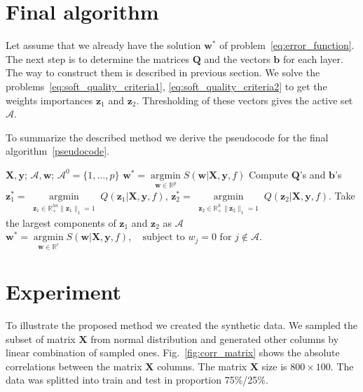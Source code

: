 \documentclass[a4paper,12pt]{article}
\theoremstyle{plain} %
\theoremstyle{definition} %
\theoremstyle{remark} %
\newcommand{\bb}{\mathbf{b}}
\newcommand{\bw}{\mathbf{w}}
\newcommand{\bQ}{\mathbf{Q}}
\newcommand{\by}{\mathbf{y}}
\newcommand{\bz}{\mathbf{z}}
\newcommand{\bX}{\mathbf{X}}
\newcommand{\cA}{\mathcal{A}}
\newcommand{\bbR}{\mathbb{R}}
\newcommand{\argmin}{\mathop{\arg \min}\limits}
\begin{document}
	\section{Final algorithm}
	Let assume that we already have the solution $\bw^*$ of problem~\ref{eq:error_function}.
	The next step is to determine the matrices $\bQ$ and the vectors $\bb$ for each layer. The way to construct them is described in previous section. 
	We solve the problems~\ref{eq:soft_quality_criteria1}, \ref{eq:soft_quality_criteria2} to get the weights importances $\bz_1$ and $\bz_2$. 
	Thresholding of these vectors gives the active set $\cA$.
	
	To summarize the described method we derive the pseudocode for the final algorithm~\ref{pseudocode}.
	
	
	\begin{algorithm}[h]
		\caption{}
		\label{pseudocode}
		\begin{algorithmic}[1]
			\REQUIRE $\bX, \by$;
			\ENSURE $\cA, \bw$;
			\STATE $\cA^0 = \{1, \dots, p\}$
			\STATE $\bw^* = \argmin_{\bw \in \bbR^p} S(\bw | \bX, \by, f)$
			\vspace{0.1cm}
			\STATE Compute $\bQ$'s and $\bb$'s			
			\vspace{0.1cm}
			\STATE 
			$\bz_1^* = \argmin_{\substack{\bz_1 \in \bbR^{hn}_{+} \| \bz_1 \|_1 = 1}} Q(\bz_1 | \bX, \by, f)$, \quad
			$\bz_2^* = \argmin_{\substack{ \bz_2 \in \bbR^{h}_{+} \| \bz_2 \|_1 = 1}} Q(\bz_2 | \bX, \by, f)$.			
			\vspace{0.1cm}
			\STATE Take the largest components of $\bz_1$ and $\bz_2$ as $\cA$
			\vspace{0.1cm}
			\STATE $\bw^* = \argmin_{\bw \in \bbR^r} S(\bw | \bX, \by, f), \quad \text{subject to } w_j = 0 \text{ for } j \notin \cA.$
		\end{algorithmic}
	\end{algorithm}

	\section*{Experiment}
	
	To illustrate the proposed method we created the synthetic data. 
	We sampled the subset of matrix $\bX$ from normal distribution and generated other columns by linear combination of sampled ones. 
	Fig.~\ref{fig:corr_matrix} shows the absolute correlations between the matrix $\bX$ columns.
	The matrix $\bX$ size is $800 \times 100$. 
	The data was splitted into train and test in proportion 75\%/25\%.
	
\end{document}

